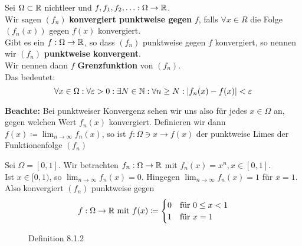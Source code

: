 \begin{subdefinition}
	Sei $ \Omega \subset \mathbb{R}  $ nichtleer und $ f, f_1, f_2, \dotsc: \Omega \to \mathbb{R}  $.\\
	Wir sagen $ (f_n) $ \textbf{konvergiert punktweise gegen} $ f $, falls $ \forall x \in R $ die Folge $ (f_n(x)) $ gegen $ f(x) $ konvergiert.\\
	Gibt es ein $ f:\Omega\to \mathbb{R}  $, so dass $ (f_n) $ punktweise gegen $ f $ konvergiert, so nennen wir $ (f_n) $ \textbf{punktweise konvergent}.\\
	Wir nennen dann $ f $ \textbf{Grenzfunktion} von $ (f_n) $.\\
	Das bedeutet:
	\[
		\forall x \in \Omega: \forall \varepsilon > 0 : \exists N \in \mathbb{N} : \forall n \geq N: |f_n(x) - f(x) | < \varepsilon 
	\]
\end{subdefinition}
\textbf{Beachte:} Bei punktweiser Konvergenz sehen wir uns also für jedes $ x \in \Omega $ an, gegen welchen Wert $ f_n(x) $ konvergiert. Definieren wir dann $ f(x) \coloneqq \lim_{n \to \infty} f_n(x) $, so ist $ f:\Omega \ni x \to f(x) $ der punktweise Limes der Funktionenfolge $ (f_n) $
\begin{subexample}
	Sei $ \Omega = [0, 1] $. Wir betrachten $ f_n: \Omega \to \mathbb{R}  $ mit $ f_n(x) = x^n, x \in [0, 1] $.\\
	Ist $ x \in [0, 1) $, so $ \lim_{n \to \infty} f_n(x) = 0 $. Hingegen $ \lim_{n \to \infty} f_n(x) = 1 $ für $ x = 1 $.
	Also konvergiert $ (f_n) $ punktweise gegen
	\[
		f: \Omega \to \mathbb{R} \text{ mit } f(x) \coloneqq \begin{cases}
			0 & \text{für } 0\leq x<1\\
			1 & \text{für } x = 1
		\end{cases}
	\]
\end{subexample}
\begin{figure}[!ht]
	\centering
	\caption{Definition 8.1.2}
	\label{Definition8.1.2}
\end{figure}

